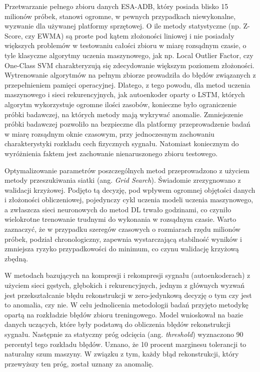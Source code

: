 \documentclass[a4paper,twoside,12pt]{book}
\newcommand{\obcy}[1]{\emph{#1}}
\newcommand{\english}[1]{{\selectlanguage{british}\obcy{#1}}}
\begin{document}
Przetwarzanie pełnego zbioru danych ESA-ADB, który posiada blisko 15 milionów próbek, stanowi ogromne, w pewnych przypadkach niewykonalne, wyzwanie dla używanej platformy sprzętowej. O ile metody statystyczne (np. Z-Score, czy EWMA) są proste pod kątem złożoności liniowej i nie posiadały większych problemów w testowaniu całości zbioru w miarę rozsądnym czasie, o tyle klasyczne algorytmy uczenia maszynowego, jak np. Local Outlier Factor, czy One-Class SVM charakteryzują się zdecydowanie większym poziomem złożoności. Wytrenowanie algorytmów na pełnym zbiorze prowadziła do błędów związanych z przepełnieniem pamięci operacyjnej. Dlatego, z tego powodu, dla metod uczenia maszynowego i sieci rekurencyjnych, jak autoenkoder oparty o LSTM, których algorytm wykorzystuje ogromne ilości zasobów, konieczne było ograniczenie próbki badawczej, na których metody mają wykrywać anomalie. Zmniejszenie próbki badawczej pozwoliło na bezpieczne dla platformy przeprowadzenie badań w miarę rozsądnym oknie czasowym, przy jednoczesnym zachowaniu charakterystyki rozkładu cech fizycznych sygnału. Natomiast koniecznym do wyróżnienia faktem jest zachowanie nienaruszonego zbioru testowego. 

Optymalizowanie parametrów poszczególnych metod przeprowadzono z użyciem metody przeszukiwania siatki (ang. \english{Grid Search}). Świadomie zrezygnowano z walidacji krzyżowej. Podjęto tą decyzję, pod wpływem ogromnej objętości danych i złożoności obliczeniowej, pojedynczy cykl uczenia modeli uczenia maszynowego, a zwłaszcza sieci neuronowych do metod DL trwało godzinami, co czyniło wielokrotne trenowanie trudnymi do wykonania w rozsądnym czasie. Warto zaznaczyć, że w  przypadku szeregów czasowych o rozmiarach rzędu milionów próbek, podział chronologiczny, zapewnia wystarczającą stabilność wyników i zmniejsza ryzyko przypadkowości do minimum, co czynu walidację krzyżową zbędną.

W metodach bazujących na kompresji i rekompresji sygnału (autoenkoderach) z użyciem sieci gęstych, głębokich i rekurencyjnych, jednym z głównych wyzwań jest przekształcanie błędu rekonstrukcji w zero-jedynkową decyzję o tym czy jest to anomalia, czy nie. W celu jednolicenia metodologii badań przyjęto metodykę opartą na rozkładzie błędów zbioru treningowego. Model wnioskował na bazie danych uczących, które były podstawą do obliczenia błędów rekonstrukcji sygnału. Następnie za statyczny próg odcięcia (ang. \english{threshold}) wyznaczono 90 percentyl tego rozkładu błędów. Uznano, że 10 procent marginesu tolerancji to naturalny szum maszyny. W związku z tym, każdy błąd rekonstrukcji, który przewyższy ten próg, został uznany za anomalię.
\end{document}
